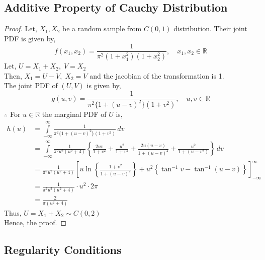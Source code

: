 \documentclass[12pt, fleqn, a4paper]{article}
\begin{document}
	\subsection{Additive Property of Cauchy Distribution} \label{adprop}
	\begin{proof}
		Let, \(X_1,X_2\) be a random sample from \(C(0,1)\) distribution. Their joint PDF is given by, 
		$$ f(x_1,x_2)=\frac{1}{\pi^2(1+x_1^2)(1+x_2^2)},\quad x_1,x_2 \in\mathbb{R} $$ Let, \(U=X_1+X_2,\;V=X_2\) \\
		Then, \(X_1=U-V,\;X_2=V\) and the jacobian of the transformation is 1. \\ 
		The joint PDF of \((U,V)\) is given by, 
		$$ g(u,v)=\frac{1}{\pi^2\{1+(u-v)^2\}(1+v^2)},\quad u,v\in \mathbb{R} $$ 
		\(\therefore\) For \(u\in\mathbb{R}\) the marginal PDF of \(U\) is, 
		\begin{align*}
			h(u)&=\int\limits_{-\infty}^\infty \frac{1}{\pi^2\{1+(u-v)^2\}(1+v^2)}\,dv \\
			&=\int\limits_{-\infty}^\infty\frac{1}{\pi^2u^2(u^2+4)}\left\{\frac{2uv}{1+v^2}+\frac{u^2}{1+v^2}+\frac{2u(u-v)}{1+(u-v)^2}+\frac{u^2}{1+(u-v^2)}\right\} \,dv \\
			&=\frac{1}{\pi^2u^2(u^2+4)}\left[u\ln\left\{\frac{1+v^2}{1+(u-v)^2}\right\}+u^2\left\{\tan^{-1}v-\tan^{-1}(u-v)\right\}\right]^\infty_{-\infty} \\
			&=\frac{1}{\pi^2u^2(u^2+4)}\cdot u^2\cdot2\pi\\
			&=\frac{2}{\pi(u^2+4)}
		\end{align*}
		Thus, \(U=X_1+X_2\sim C(0,2)\) \\
		Hence, the proof.
	\end{proof}
	
	\subsection{Regularity Conditions}\label{CR}
\end{document}

